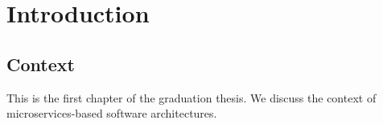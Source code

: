 \chapter{Introduction}
\section{Context}
This is the first chapter of the graduation thesis. We discuss the context of microservices-based software architectures.
